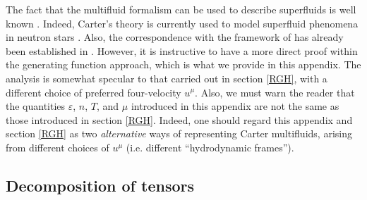 \documentclass[a4paper, amsfonts, amssymb, amsmath, reprint, showkeys, nofootinbib, twoside, onecolumn, notitlepage]{revtex4-1}
\begin{document}
The fact that the multifluid formalism can be used to describe superfluids is well known \cite{Carter_starting_point,cool1995,carter92}. Indeed, Carter's theory is currently used to model superfluid phenomena in neutron stars \cite{langlois98,sourie_glitch2017,
Geo2020,RauWasserman2020,GavassinoIordanskii2021}. Also, the correspondence with the framework of \cite{Son2001,HoloSup2009,Battacharya2011,Bhattacharya2014,
JensenKovtun2012} has already been established in \cite{Termo,andersson2007review}. However, it is instructive to have a more direct proof within the generating function approach, which is what we provide in this appendix. The analysis is somewhat specular to that carried out in section \ref{RGH}, with a different choice of preferred four-velocity $u^\mu$. Also, we must warn the reader that the quantities $\varepsilon$, $n$, $T$, and $\mu$ introduced in this appendix are not the same as those introduced in section \ref{RGH}. Indeed, one should regard this appendix and section \ref{RGH} as two \textit{alternative} ways of representing Carter multifluids, arising from different choices of $u^\mu$ (i.e. different ``hydrodynamic frames'').

\subsection{Decomposition of tensors}
\end{document}
